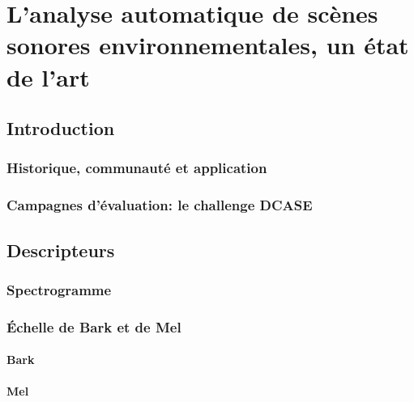 \chapter[État de l'art]{L'analyse automatique de scènes sonores environnementales, un état de l'art}\label{ch:ml_ea}


\section{Introduction}

\subsection{Historique, communauté et application}


\subsection{Campagnes d'évaluation: le challenge DCASE}
\label{sec:ch6_challengeDcasePresentation}


\section{Descripteurs}

\subsection{Spectrogramme}
\label{sec:ch6_spec}

\subsection{Échelle de Bark et de Mel}

\subsubsection{Bark}
\label{sec:ch6_Bark}

\subsubsection{Mel}
\label{sec:ch6_Mel}

